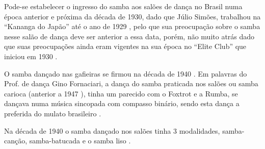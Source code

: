 Pode-se estabelecer o ingresso do samba aos salões de dança no Brasil numa época anterior e próxima da década de 1930,
dado que Júlio Simões, trabalhou na ``Kananga do Japão'' até o ano de 1929 \cite[pp. 3 - cad. 3]{juliosimoes}  
\cite[pp. 11]{eliteinaugura} \cite[pp. 1 - cad. B]{gafieira2000reis}, pelo que sua preocupação sobre o samba 
nesse salão de dança deve ser anterior a essa data, porém, não muito atrás dado que 
suas preocupações ainda eram vigentes na sua época no ``Elite Club'' 
que iniciou em 1930 \cite[pp. 11]{eliteinaugura} \cite[pp. 3 - cad. 3]{juliosimoes} \cite[pp. 10]{simoesjournalbrasil1}.


O samba dançado nas gafieiras se firmou na década de 1940 \cite[pp. 142]{perna2002samba}. 
Em palavras do Prof. de dança Gino Fornaciari, 
a dança do samba praticada nos salões ou samba carioca (anterior a 1947 \cite[pp. 50]{fornaciari1947aprender}), 
 tinha um parecido com o Foxtrot e a Rumba, se dançava numa música sincopada com compasso binário,
sendo esta dança a preferida do mulato brasileiro
\cite[pp. 50-51]{fornaciari1947aprender}.


Na década de 1940 o samba dançado nos salões 
tinha 3 modalidades, samba-canção, samba-batucada e o samba liso \cite[pp. 58]{freitas1959danca} \cite[pp. 142-143]{perna2002samba} 
\cite[pp. 51]{fornaciari1947aprender}\cite[pp. 51]{fornaciari1950aprender}.

